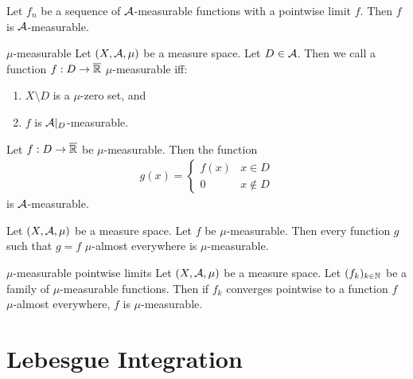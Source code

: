 \begin{importantcorollary}{}{}
	Let $f_n$ be a sequence of $\mathcal{A}$-measurable functions with a pointwise limit $f$. Then $f$ is $\mathcal{A}$-measurable.
\end{importantcorollary}
\begin{importantdefinition}{$\mu$-measurable}{}
	Let $(X, \mathcal{A}, \mu)$ be a measure space. Let $D \in \mathcal{A}$. Then we call a function $f : D \to \overline{{\mathbb{R}}}$ $\mu$-measurable iff:
	\begin{enumerate}
		\item $X \setminus D$ is a $\mu$-zero set, and
		\item $f$ is $\mathcal{A}|_D$-measurable.
	\end{enumerate}
\end{importantdefinition}
\begin{lemma}
	Let $f : D \to \overline{{\mathbb{R}}}$ be $\mu$-measurable. Then the function
	\begin{align*}
		g(x) =
		\begin{cases}
			f(x) & x \in D\\
			0 & x \notin D
		\end{cases}
	\end{align*}
	is $\mathcal{A}$-measurable.
\end{lemma}
\begin{importantlemma}{}{}
	Let $(X, \mathcal{A}, \mu)$ be a  measure space. Let $f$ be $\mu$-measurable. Then every function $g$ such that $g = f$ $\mu$-almost everywhere is $\mu$-measurable.
\end{importantlemma}
\begin{importanttheorem}{$\mu$-measurable pointwise limits}{}
	Let $(X, \mathcal{A}, \mu)$ be a  measure space. Let $(f_k)_{k \in \mathbb{N}}$ be a family of $\mu$-measurable functions. Then if $f_k$ converges pointwise to a function $f$ $\mu$-almost everywhere, $f$ is $\mu$-measurable.
\end{importanttheorem}

\chapter{Lebesgue Integration}
